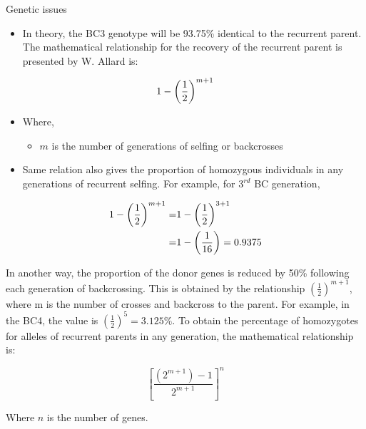 \documentclass[11pt,ignorenonframetext,aspectratio=169]{beamer}
\providecommand{\tightlist}{%
  \setlength{\itemsep}{0pt}\setlength{\parskip}{0pt}}
\begin{document}
\begin{frame}{Genetic issues}
\protect\hypertarget{genetic-issues}{}
\small

\begin{itemize}
\tightlist
\item
  In theory, the BC3 genotype will be 93.75\% identical to the recurrent
  parent. The mathematical relationship for the recovery of the
  recurrent parent is presented by W. Allard is:
\end{itemize}

\[
\small
1-\left(\frac{1}{2}\right)^{m+1}
\]

\begin{itemize}
\tightlist
\item
  Where,

  \begin{itemize}
  \footnotesize
  \item $m$ is the number of generations of selfing or backcrosses
  \end{itemize}
\item
  Same relation also gives the proportion of homozygous individuals in
  any generations of recurrent selfing. For example, for \(3^{rd}\) BC
  generation,
\end{itemize}

\[
\begin{aligned}
\small
1-\left(\frac{1}{2}\right)^{m+1} =& 1-\left(\frac{1}{2}\right)^{3+1} \\
=& 1-\left(\frac{1}{16}\right) = 0.9375
\end{aligned}
\]
\end{frame}

\begin{frame}{}
\protect\hypertarget{section-18}{}
In another way, the proportion of the donor genes is reduced by 50\%
following each generation of backcrossing. This is obtained by the
relationship \(\left(\frac{1}{2}\right)^{m+1}\), where m is the number
of crosses and backcross to the parent. For example, in the BC4, the
value is \(\left(\frac{1}{2}\right)^{5} = 3.125\%\). To obtain the
percentage of homozygotes for alleles of recurrent parents in any
generation, the mathematical relationship is:

\[\left[\frac{\left(2^{m+1}\right)-1}{2^{m+1}}\right]^{n}\]

Where \(n\) is the number of genes.
\end{frame}
\end{document}
